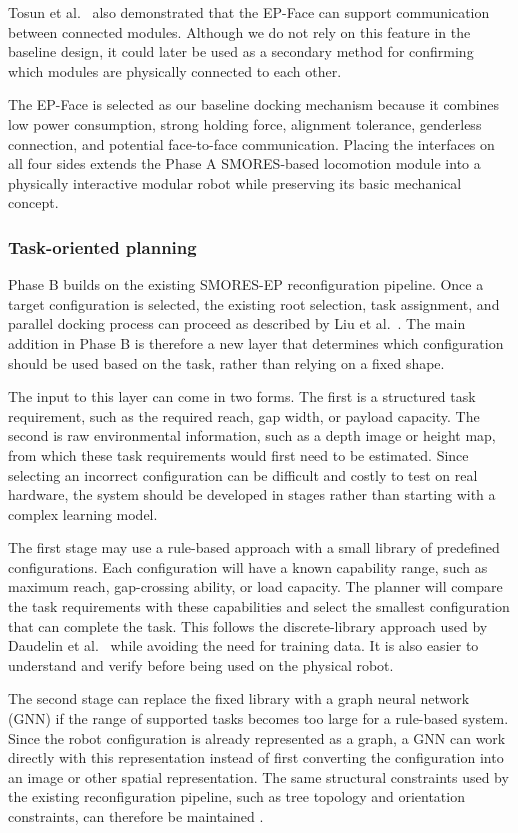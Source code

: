 \documentclass[11pt,a4paper]{article}
\newcounter{gsub}
\newcommand{\gsubsub}[1]{\subsubsection*{#1}}
\begin{document}
Tosun et al.\ \cite{tosun2016} also demonstrated that the EP-Face can support
communication between connected modules. Although we do not rely on this
feature in the baseline design, it could later be used as a secondary method
for confirming which modules are physically connected to each other.

The EP-Face is selected as our baseline docking mechanism because it combines
low power consumption, strong holding force, alignment tolerance, genderless
connection, and potential face-to-face communication. Placing the interfaces on
all four sides extends the Phase A SMORES-based locomotion module into a
physically interactive modular robot while preserving its basic mechanical
concept.

\gsubsub{Task-oriented planning}

Phase B builds on the existing SMORES-EP reconfiguration pipeline. Once a
target configuration is selected, the existing root selection, task assignment,
and parallel docking process can proceed as described by Liu et al.\
\cite{liu2023}. The main addition in Phase B is therefore a new layer that
determines which configuration should be used based on the task, rather than
relying on a fixed shape.

The input to this layer can come in two forms. The first is a structured task
requirement, such as the required reach, gap width, or payload capacity. The
second is raw environmental information, such as a depth image or height map,
from which these task requirements would first need to be estimated. Since
selecting an incorrect configuration can be difficult and costly to test on
real hardware, the system should be developed in stages rather than starting
with a complex learning model.

The first stage may use a rule-based approach with a small library of
predefined configurations. Each configuration will have a known capability
range, such as maximum reach, gap-crossing ability, or load capacity. The
planner will compare the task requirements with these capabilities and select
the smallest configuration that can complete the task. This follows the
discrete-library approach used by Daudelin et al.\ \cite{daudelin2018} while
avoiding the need for training data. It is also easier to understand and verify
before being used on the physical robot.

The second stage can replace the fixed library with a graph neural network
(GNN) if the range of supported tasks becomes too large for a rule-based
system. Since the robot configuration is already represented as a graph, a GNN
can work directly with this representation instead of first converting the
configuration into an image or other spatial representation. The same
structural constraints used by the existing reconfiguration pipeline, such as
tree topology and orientation constraints, can therefore be maintained
\cite{liu2023}.
\end{document}

